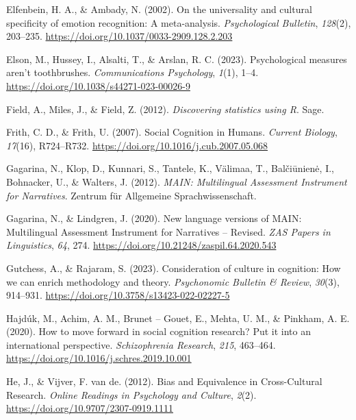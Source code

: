 \documentclass[
  man,floatsintext]{apa7}
\newlength{\cslhangindent}
\newenvironment{CSLReferences}[2] %
 {\begin{list}{}{%
  \setlength{\itemindent}{0pt}
  \setlength{\leftmargin}{0pt}
  \setlength{\parsep}{0pt}
  \ifodd #1
   \setlength{\leftmargin}{\cslhangindent}
   \setlength{\itemindent}{-1\cslhangindent}
  \fi
  \setlength{\itemsep}{#2\baselineskip}}}
 {\end{list}}
\begin{document}
\begin{CSLReferences}{1}{0}
Elfenbein, H. A., \& Ambady, N. (2002). On the universality and cultural specificity of emotion recognition: {A} meta-analysis. \emph{Psychological Bulletin}, \emph{128}(2), 203--235. \url{https://doi.org/10.1037/0033-2909.128.2.203}

Elson, M., Hussey, I., Alsalti, T., \& Arslan, R. C. (2023). Psychological measures aren't toothbrushes. \emph{Communications Psychology}, \emph{1}(1), 1--4. \url{https://doi.org/10.1038/s44271-023-00026-9}

Field, A., Miles, J., \& Field, Z. (2012). \emph{Discovering statistics using {R}}. Sage.

Frith, C. D., \& Frith, U. (2007). Social {Cognition} in {Humans}. \emph{Current Biology}, \emph{17}(16), R724--R732. \url{https://doi.org/10.1016/j.cub.2007.05.068}

Gagarina, N., Klop, D., Kunnari, S., Tantele, K., Välimaa, T., Balčiūnienė, I., Bohnacker, U., \& Walters, J. (2012). \emph{{MAIN}: {Multilingual Assessment Instrument} for {Narratives}}. Zentrum f{ü}r Allgemeine Sprachwissenschaft.

Gagarina, N., \& Lindgren, J. (2020). New language versions of {MAIN}: {Multilingual Assessment Instrument} for {Narratives} -- {Revised}. \emph{ZAS Papers in Linguistics}, \emph{64}, 274. \url{https://doi.org/10.21248/zaspil.64.2020.543}

Gutchess, A., \& Rajaram, S. (2023). Consideration of culture in cognition: {How} we can enrich methodology and theory. \emph{Psychonomic Bulletin \& Review}, \emph{30}(3), 914--931. \url{https://doi.org/10.3758/s13423-022-02227-5}

Hajdúk, M., Achim, A. M., Brunet -- Gouet, E., Mehta, U. M., \& Pinkham, A. E. (2020). How to move forward in social cognition research? {Put} it into an international perspective. \emph{Schizophrenia Research}, \emph{215}, 463--464. \url{https://doi.org/10.1016/j.schres.2019.10.001}

He, J., \& Vijver, F. van de. (2012). Bias and {Equivalence} in {Cross-Cultural Research}. \emph{Online Readings in Psychology and Culture}, \emph{2}(2). \url{https://doi.org/10.9707/2307-0919.1111}


\end{CSLReferences}
\end{document}
